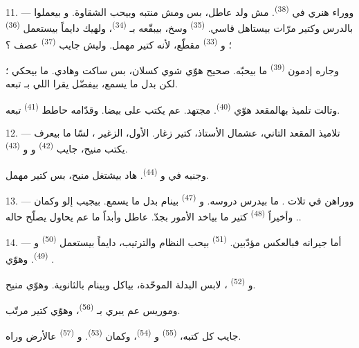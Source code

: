 \VUsaut{4.2mm}
\VUsaut{3.2mm}

11. --- ووراء هنري في  \textsuperscript{(38)}. مش ولد
عاطل، بس  ومش منتبه وبيحب الشقاوة. 
و بيعملوا  بالدرس وكتير مرّات بيستاهل
 قاسي.  \textsuperscript{(35)} وسخ،
بيبقّعه بـ \textsuperscript{(34)}، ولهيك دايماً بيستعمل
 \textsuperscript{(36)} ؛ و
\textsuperscript{(33)} مقطّع، لأنه كتير مهمل. وليش جايب
 \textsuperscript{(37)} عصف  ؟

وجاره إدمون \textsuperscript{(39)} ما بيحبّه. صحيح هوّي شوي كسلان، بس
ساكت وهادي. ما بيحكي ؛ لكن بدل ما يسمع، بيفضّل يقرا  اللي
بـ تبعه.

وتالت تلميذ بهالمقعد هوّي  \textsuperscript{(40)}. مجتهد.
عم يكتب على  بيضا. وقدّامه حاطط 
\textsuperscript{(41)} تبعه.

12. --- تلاميذ المقعد التاني، عشمال الأستاذ، كتير زغار. الأول، الزغير
، لسّا ما بيعرف يكتب منيح، جايب 
\textsuperscript{(42)} و و
\textsuperscript{(43)}.

وجنبه في  و \textsuperscript{(44)}. هاد
بيشتغل منيح، بس  كتير مهمل.

13. --- ووراهن في تلات .  ما بيدرس دروسه.
و \textsuperscript{(47)} بينام بدل ما يسمع. 
بيجيب إلو  وكمان . وأخيراً 
\textsuperscript{(48)} كتير ما بياخد الأمور بجدّ.  عاطل
وأبداً ما عم يحاول يصلّح حاله.

14. --- أما جيرانه فبالعكس مؤدّبين.  \textsuperscript{(51)}
بيحب النظام والترتيب، دايماً بيستعمل 
\textsuperscript{(50)} و \textsuperscript{(49)}. وهوّي
.

و \textsuperscript{(52)} ، لابس البدلة
الموحّدة، بياكل وبينام بالثانوية. وهوّي  منيح.

وموريس عم يبري  بـ \textsuperscript{(56)}،
وهوّي كتير مرتّب.

جايب كل كتبه،  \textsuperscript{(55)}
و \textsuperscript{(54)}، وكمان
 \textsuperscript{(53)}. و
\textsuperscript{(57)} عالأرض وراه.

